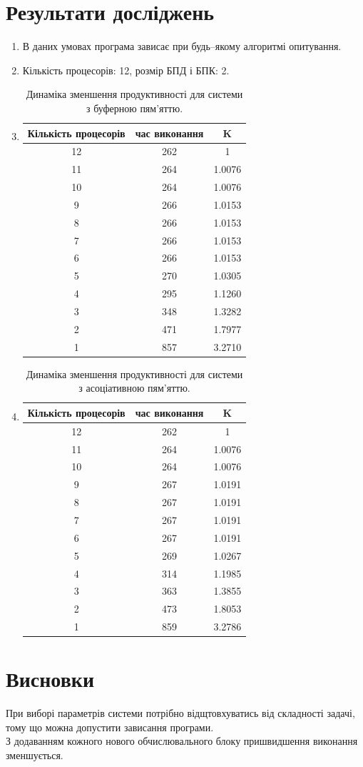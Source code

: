 \documentclass[a4paper, 10pt]{article}
\begin{document}
\section{Результати досліджень}
\begin{enumerate}
	\item В даних умовах програма зависає при будь--якому алгоритмі опитування.
	\item Кількість процесорів: 12, розмір БПД і БПК: 2.
	\item {
		\begin{table}[H]
		\centering
		\begin{tabular}{|c|c|c|}
		\hline
		Кількість процесорів & час виконання & K \\
		\hline
		12 & 262 & 1      \\
		11 & 264 & 1.0076 \\
		10 & 264 & 1.0076 \\
	 	 9 & 266 & 1.0153 \\
		 8 & 266 & 1.0153 \\
		 7 & 266 & 1.0153 \\
		 6 & 266 & 1.0153 \\
		 5 & 270 & 1.0305 \\
		 4 & 295 & 1.1260 \\
		 3 & 348 & 1.3282 \\
		 2 & 471 & 1.7977 \\
		 1 & 857 & 3.2710 \\
		\hline
		\end{tabular}
		\caption{Динаміка зменшення продуктивності для системи з буферною пям'яттю.}
		\end{table}
	}

	\item {
		\begin{table}[H]
		\centering
		\begin{tabular}{|c|c|c|}
		\hline
		Кількість процесорів & час виконання & K \\
		\hline
		12 & 262 & 1      \\
		11 & 264 & 1.0076 \\
		10 & 264 & 1.0076 \\
	 	 9 & 267 & 1.0191 \\
		 8 & 267 & 1.0191 \\
		 7 & 267 & 1.0191 \\
		 6 & 267 & 1.0191 \\
		 5 & 269 & 1.0267 \\
		 4 & 314 & 1.1985 \\
		 3 & 363 & 1.3855 \\
		 2 & 473 & 1.8053 \\
		 1 & 859 & 3.2786 \\
		\hline
		\end{tabular}
		\caption{Динаміка зменшення продуктивності для системи з асоціативною пям'яттю.}
		\end{table}
	}
\end{enumerate}

\section{Висновки}
При виборі параметрів системи потрібно відщтовхуватись від складності задачі, тому що можна допустити зависання програми.\\
З додаванням кожного нового обчислювального блоку пришвидшення виконання зменшується.
\end{document}
